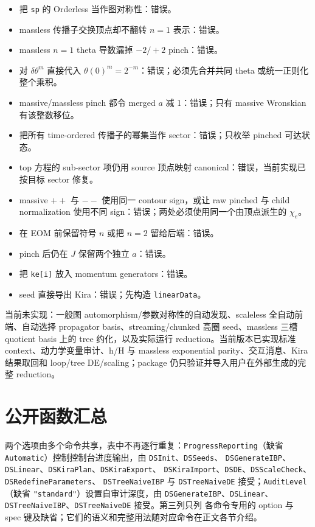 ﻿\documentclass[a4paper,11pt]{article}
\begin{document}
\begin{itemize}
  \item 把 \texttt{sp} 的 Orderless 当作图对称性：错误。
  \item massless 传播子交换顶点却不翻转 $n=1$ 表示：错误。
  \item massless $n=1$ theta 导数漏掉 $-2/+2$ pinch：错误。
  \item 对 $\delta\theta^m$ 直接代入 $\theta(0)^m=2^{-m}$：错误；必须先合并共同 theta 或统一正则化整个乘积。
  \item massive/massless pinch 都令 merged $a$ 减 1：错误；只有 massive Wronskian 有该整数移位。
  \item 把所有 time-ordered 传播子的幂集当作 sector：错误；只枚举 pinched 可达状态。
  \item top 方程的 sub-sector 项仍用 source 顶点映射 canonical：错误，当前实现已按目标 sector 修复。
  \item massive $++$ 与 $--$ 使用同一 contour sign，或让 raw pinched 与 child normalization 使用不同 sign：错误；两处必须使用同一个由顶点派生的 $\chi_e$。
  \item 在 EOM 前保留符号 $n$ 或把 $n=2$ 留给后端：错误。
  \item pinch 后仍在 $J$ 保留两个独立 $a$：错误。
  \item 把 \texttt{ke[i]} 放入 momentum generators：错误。
  \item seed 直接导出 Kira：错误；先构造 \texttt{linearData}。
\end{itemize}

当前未实现：一般图 automorphism/参数对称性的自动发现、scaleless 全自动前端、自动选择 propagator basis、streaming/chunked 高圈 seed、massless 三槽 quotient basis 上的 tree 约化，以及实际运行 reduction。当前版本已实现标准 context、动力学变量审计、h/H 与 massless exponential parity、交互消息、Kira 结果取回和 loop/tree DE/scaling；package 仍只验证并导入用户在外部生成的完整 reduction。

\appendix
\section{公开函数汇总}

两个选项由多个命令共享，表中不再逐行重复：\texttt{ProgressReporting}（缺省
\texttt{Automatic}）控制控制台进度输出，由 \texttt{DSInit}、\allowbreak\texttt{DSSeeds}、\allowbreak
\texttt{DSGenerateIBP}、\allowbreak\texttt{DSLinear}、\allowbreak\texttt{DSKiraPlan}、\allowbreak\texttt{DSKiraExport}、\allowbreak
\texttt{DSKiraImport}、\allowbreak\texttt{DSDE}、\allowbreak\texttt{DSScaleCheck}、\allowbreak\texttt{DSRedefineParameters}、\allowbreak
\texttt{DSTreeNaiveIBP} 与 \texttt{DSTreeNaiveDE} 接受；\texttt{AuditLevel}（缺省
\texttt{"standard"}）设置自审计深度，由 \texttt{DSGenerateIBP}、\allowbreak\texttt{DSLinear}、\allowbreak
\texttt{DSTreeNaiveIBP}、\allowbreak\texttt{DSTreeNaiveDE} 接受。第三列只列
各命令专用的 option 与 spec 键及缺省；它们的语义和完整用法随对应命令在正文各节介绍。
\end{document}
